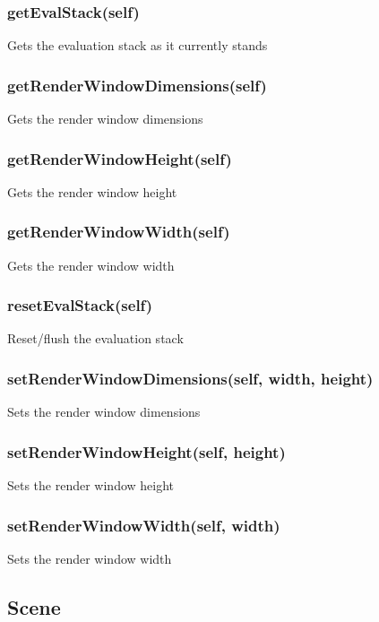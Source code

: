 \subsubsection{getEvalStack(self)}

Gets the evaluation stack as it currently stands

\subsubsection{getRenderWindowDimensions(self)}

Gets the render window dimensions

\subsubsection{getRenderWindowHeight(self)}

Gets the render window height

\subsubsection{getRenderWindowWidth(self)}

Gets the render window width

\subsubsection{resetEvalStack(self)}

Reset/flush the evaluation stack

\subsubsection{setRenderWindowDimensions(self, width, height)}

Sets the render window dimensions

\subsubsection{setRenderWindowHeight(self, height)}

Sets the render window height

\subsubsection{setRenderWindowWidth(self, width)}

Sets the render window width

\subsection{Scene}

